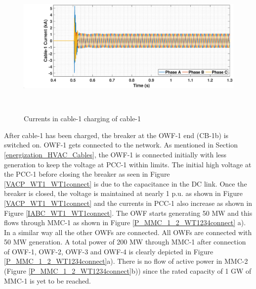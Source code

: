 \begin{figure}[H]
\hspace*{-1.2cm}
    \includegraphics[height = 7cm,width = 18.5cm]{Diagrams/Chapter_5/IABC_Cab1_Cab1charg.eps}
    \caption{Currents in cable-1 charging of cable-1}
    \label{fig:IABC_Cab1_Cab1charg}
\end{figure}

After cable-1 has been charged, the breaker at the \gls{OWF}-1 end (CB-1b) is switched on. \gls{OWF}-1 gets connected to the network. As mentioned in Section \ref{energization_HVAC_Cables}, the \gls{OWF}-1 is connected initially with less generation to keep the voltage at \gls{PCC}-1 within limits. The initial high voltage at the \gls{PCC}-1 before closing the breaker as seen in Figure \ref{VACP_WT1_WT1connect} is due to the capacitance in the DC link. Once the breaker is closed, the voltage is maintained at nearly 1 p.u. as shown in Figure \ref{VACP_WT1_WT1connect} and the currents in \gls{PCC}-1 also increase as shown in Figure \ref{IABC_WT1_WT1connect}. The \gls{OWF} starts generating 50 MW and this flows through \gls{MMC}-1 as shown in Figure \ref{P_MMC_1_2_WT1234connect} a). In a similar way all the other \gls{OWF}s are connected. All \gls{OWF}s are connected with 50 MW generation. A total power of 200 MW through \gls{MMC}-1 after connection of \gls{OWF}-1, \gls{OWF}-2, \gls{OWF}-3 and \gls{OWF}-4 is clearly depicted in Figure \ref{P_MMC_1_2_WT1234connect}a). There is no flow of active power in \gls{MMC}-2 (Figure \ref{P_MMC_1_2_WT1234connect}b)) since the rated capacity of 1 GW of \gls{MMC}-1 is yet to be reached.

